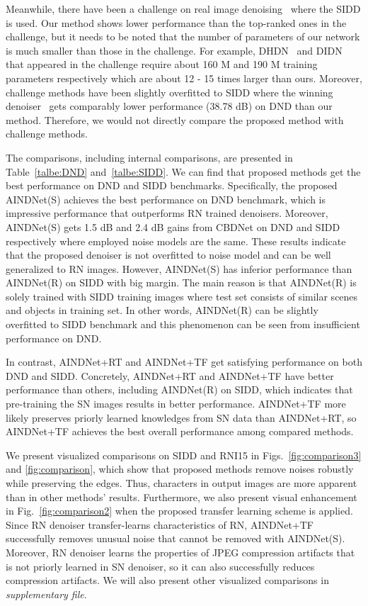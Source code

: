 \documentclass[10pt,twocolumn,letterpaper]{article}
\begin{document}
Meanwhile, there have been a challenge on real image denoising~\cite{abdelhamed2019ntire} where the SIDD is used.
Our method shows lower performance than the top-ranked ones in the challenge, but it needs to be noted that the number of parameters of our network is much smaller than those in the challenge.
For example, DHDN~\cite{park2019densely} and DIDN~\cite{yu2019deep} that appeared in the challenge require about 160 M and 190 M training parameters respectively which are about 12 $\text{-}$ 15 times larger than ours.
Moreover, challenge methods have been slightly overfitted to SIDD where the winning denoiser~\cite{kim2019grdn} gets comparably lower performance (38.78 dB) on DND than our method. Therefore, we would not directly compare the proposed method with challenge methods.
 
The comparisons, including internal comparisons, are presented in Table~\ref{talbe:DND} and~\ref{talbe:SIDD}.
We can find that proposed methods get the best performance on DND and SIDD benchmarks.
Specifically, the proposed AINDNet(S) achieves the best performance on DND benchmark, 
which is impressive performance that outperforms RN trained denoisers. 
Moreover, AINDNet(S) gets 1.5 dB and 2.4 dB gains from CBDNet on DND and SIDD respectively where employed noise models are the same.
These results indicate that the proposed denoiser is not overfitted to noise model and can be well generalized to RN images.
However, AINDNet(S) has inferior performance than AINDNet(R) on SIDD with big margin. 
The main reason is that AINDNet(R) is solely trained with SIDD training images where test set consists of similar scenes and objects in training set.
In other words, AINDNet(R) can be slightly overfitted to SIDD benchmark and this phenomenon can be seen from insufficient performance on DND.  

In contrast, AINDNet+RT and AINDNet+TF get satisfying performance on both DND and SIDD.
Concretely, AINDNet+RT and AINDNet+TF have better performance than others, including AINDNet(R) on SIDD, 
which indicates that pre-training the SN images results in better performance.
AINDNet+TF more likely preserves priorly learned knowledges from SN data than AINDNet+RT, so AINDNet+TF achieves the best overall performance among compared methods.

We present visualized comparisons on SIDD and RNI15 in Figs.~\ref{fig:comparison3} and \ref{fig:comparison}, which show that proposed methods remove noises robustly while preserving the edges. 
Thus, characters in output images are more apparent than in other methods' results.
Furthermore, we also present visual enhancement in Fig.~\ref{fig:comparison2} when the proposed transfer learning scheme is applied.
Since RN denoiser transfer-learns characteristics of RN, AINDNet+TF successfully removes unusual noise that cannot be removed with AINDNet(S).
Moreover, RN denoiser learns the properties of JPEG compression artifacts that is not priorly learned in SN denoiser, so it can also successfully reduces compression artifacts. 
We will also present other visualized comparisons in \textit{supplementary file}.
\end{document}
